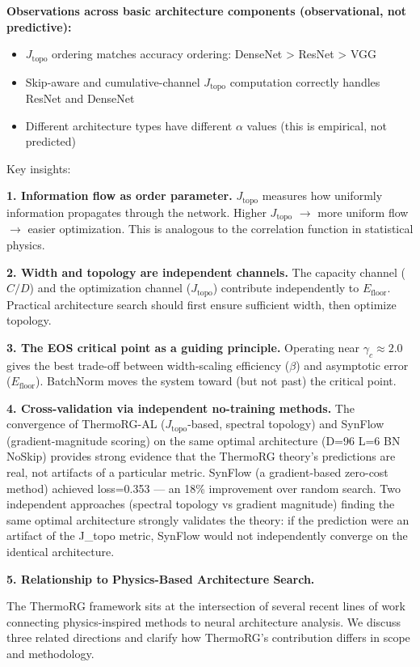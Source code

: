 \documentclass[11pt, a4paper]{article}
\theoremstyle{plain}
\begin{document}
\medskip
\noindent\textbf{Observations across basic architecture components (observational, not predictive):}
\begin{itemize}
\item $J_{\mathrm{topo}}$ ordering matches accuracy ordering: DenseNet > ResNet > VGG
\item Skip-aware and cumulative-channel $J_{\mathrm{topo}}$ computation correctly handles ResNet and DenseNet
\item Different architecture types have different $\alpha$ values (this is empirical, not predicted)
\end{itemize}

Key insights:

\textbf{1. Information flow as order parameter.} $J_{\mathrm{topo}}$ measures how uniformly information propagates through the network. Higher $J_{\mathrm{topo}}$ $\to$ more uniform flow $\to$ easier optimization. This is analogous to the correlation function in statistical physics.

\textbf{2. Width and topology are independent channels.} The capacity channel ($C/D$) and the optimization channel ($J_{\mathrm{topo}}$) contribute independently to $E_{\mathrm{floor}}$. Practical architecture search should first ensure sufficient width, then optimize topology.

\textbf{3. The EOS critical point as a guiding principle.} Operating near $\gamma_c \approx 2.0$ gives the best trade-off between width-scaling efficiency ($\beta$) and asymptotic error ($E_{\mathrm{floor}}$). BatchNorm moves the system toward (but not past) the critical point.

\textbf{4. Cross-validation via independent no-training methods.} The convergence of ThermoRG-AL ($J_{\mathrm{topo}}$-based, spectral topology) and SynFlow (gradient-magnitude scoring) on the same optimal architecture (D=96 L=6 BN NoSkip) provides strong evidence that the ThermoRG theory's predictions are real, not artifacts of a particular metric. SynFlow (a gradient-based zero-cost method) achieved loss=0.353 --- an 18\% improvement over random search. Two independent approaches (spectral topology vs gradient magnitude) finding the same optimal architecture strongly validates the theory: if the prediction were an artifact of the J\_topo metric, SynFlow would not independently converge on the identical architecture.

\medskip
\noindent\textbf{5. Relationship to Physics-Based Architecture Search.}

The ThermoRG framework sits at the intersection of several recent lines of work connecting physics-inspired methods to neural architecture analysis. We discuss three related directions and clarify how ThermoRG's contribution differs in scope and methodology.
\end{document}
